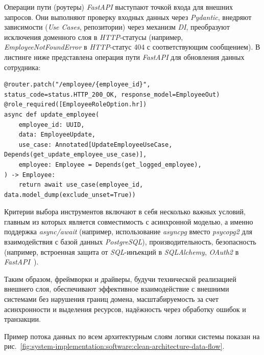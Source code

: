 Операции пути (роутеры) \textit{FastAPI} выступают точкой входа для внешних запросов. Они выполняют проверку входных данных через \textit{Pydantic}, внедряют зависимости (\textit{Use Cases}, репозитории) через механизм \textit{DI}, преобразуют исключения доменного слоя в \textit{HTTP}-статусы (например, \textit{EmployeeNotFoundError} в \textit{HTTP}-статус 404 с соответствующим сообщением). В листинге ниже представлена операция пути \textit{FastAPI} для обновления данных сотрудника:

\begin{lstlisting}[style=pythonstyle]
@router.patch("/employee/{employee_id}", status_code=status.HTTP_200_OK, response_model=EmployeeOut)
@role_required([EmployeeRoleOption.hr])
async def update_employee(
    employee_id: UUID,
    data: EmployeeUpdate,
    use_case: Annotated[UpdateEmployeeUseCase, Depends(get_update_employee_use_case)],
    employee: Employee = Depends(get_logged_employee),
) -> Employee:
    return await use_case(employee_id, data.model_dump(exclude_unset=True))
\end{lstlisting}

Критерии выбора инструментов включают в себя несколько важных условий, главным из которых является совместимость с асинхронной моделью, а именно поддержка \textit{async/await} (например, использование \textit{asyncpg} вместо \textit{psycopg2} для взаимодействия с базой данных \textit{PostgreSQL}), производительность, безопасность (например, встроенная защита от \textit{SQL}-инъекций в \textit{SQLAlchemy}, \textit{OAuth2} в \textit{FastAPI}~\cite{book_lubanovich_fastapi}).

Таким образом, фреймворки и драйверы, будучи технической реализацией внешнего слоя, обеспечивают эффективное взаимодействие с внешними системами без нарушения границ домена, масштабируемость за счет асинхронности и выделения ресурсов, надёжность через обработку ошибок и транзакции.

Пример потока данных по всем архитектурным слоям логики системы показан на рис.~\ref{fig:system-implementation:software:clean-architecture-data-flow}.

